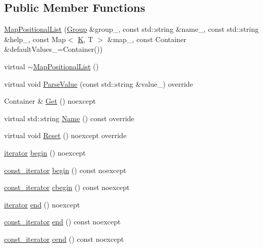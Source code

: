 \subsection*{Public Member Functions}
\begin{DoxyCompactItemize}
\item 
\hyperlink{classargs_1_1_map_positional_list_ab8dc23a5947d8f10d0e71d907248f52f}{Map\+Positional\+List} (\hyperlink{classargs_1_1_group}{Group} \&group\+\_\+, const std\+::string \&name\+\_\+, const std\+::string \&help\+\_\+, const Map$<$ \hyperlink{cgal__test_8cpp_a891e241aa245ae63618f03737efba309}{K}, T $>$ \&map\+\_\+, const Container \&default\+Values\+\_\+=Container())
\item 
virtual \hyperlink{classargs_1_1_map_positional_list_acd2d9a2a9dafb35ff7d85b2aebe4d94e}{$\sim$\+Map\+Positional\+List} ()
\item 
virtual void \hyperlink{classargs_1_1_map_positional_list_ac2d042c42bc771954f340dc0a3b582c7}{Parse\+Value} (const std\+::string \&value\+\_\+) override
\item 
Container \& \hyperlink{classargs_1_1_map_positional_list_ad34d106fb81d46943392c74fb987fd27}{Get} () noexcept
\item 
virtual std\+::string \hyperlink{classargs_1_1_map_positional_list_a06d9cd19fea86e0027f2ab4a491f19bb}{Name} () const override
\item 
virtual void \hyperlink{classargs_1_1_map_positional_list_a69eefecdabf07a4fac7006acb2b144d3}{Reset} () noexcept override
\item 
\hyperlink{classargs_1_1_map_positional_list_a4e3fbeb6f894505ce48d35fe76dc157a}{iterator} \hyperlink{classargs_1_1_map_positional_list_a5ec966fa9cf2064c32026b817e1a8f25}{begin} () noexcept
\item 
\hyperlink{classargs_1_1_map_positional_list_a0700556b0a067e095ee22edbb18206fc}{const\+\_\+iterator} \hyperlink{classargs_1_1_map_positional_list_a40aecf3ee765506dbf54628d6ba999a5}{begin} () const noexcept
\item 
\hyperlink{classargs_1_1_map_positional_list_a0700556b0a067e095ee22edbb18206fc}{const\+\_\+iterator} \hyperlink{classargs_1_1_map_positional_list_a5d4eda96b1f2ae63fd36b6f3a3ab80a7}{cbegin} () const noexcept
\item 
\hyperlink{classargs_1_1_map_positional_list_a4e3fbeb6f894505ce48d35fe76dc157a}{iterator} \hyperlink{classargs_1_1_map_positional_list_a3605bc6cf2e3b6d263f62938dc397148}{end} () noexcept
\item 
\hyperlink{classargs_1_1_map_positional_list_a0700556b0a067e095ee22edbb18206fc}{const\+\_\+iterator} \hyperlink{classargs_1_1_map_positional_list_a1bbe7a376ba441f6525b73e1ed00d457}{end} () const noexcept
\item 
\hyperlink{classargs_1_1_map_positional_list_a0700556b0a067e095ee22edbb18206fc}{const\+\_\+iterator} \hyperlink{classargs_1_1_map_positional_list_a2e84a5f143ad24ad1967c3f7b788dff0}{cend} () const noexcept
\end{DoxyCompactItemize}
